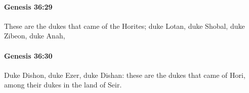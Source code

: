 		\paragraph{Genesis 36:29} %
			\label{GENESIS-36-29}

			These are the dukes that came of the Horites; duke Lotan, duke Shobal, duke Zibeon, duke Anah,


		\paragraph{Genesis 36:30} %
			\label{GENESIS-36-30}

			Duke Dishon, duke Ezer, duke Dishan: these are the dukes that came of Hori, among their dukes in the land of Seir.


